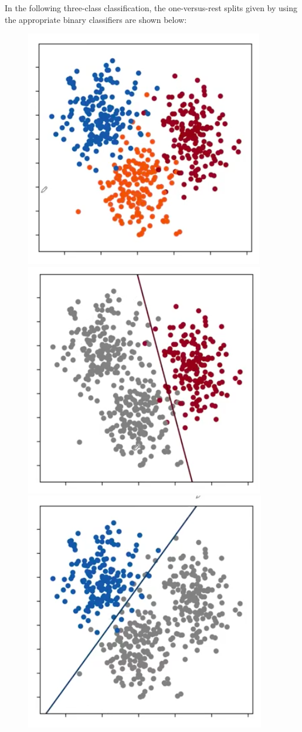 \begin{frameex}
In the following three-class classification, the one-versus-rest splits given by using the appropriate binary classifiers are shown below:
\begin{figure}[H]
\centering
\includegraphics[scale=0.4]{onevsrest1.png}
\includegraphics[scale=0.4]{onevsrest2.png}
\includegraphics[scale=0.4]{onevsrest3.png}

\end{figure}
\end{frameex}
